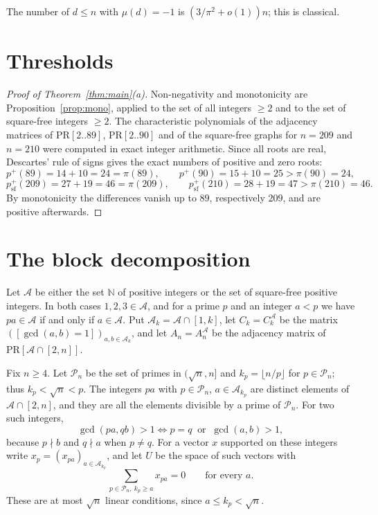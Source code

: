 \documentclass[11pt]{amsart}
\theoremstyle{definition}
\theoremstyle{remark}
\newcommand{\PR}{\mathrm{PR}}
\newcommand{\pp}{p^{+}}
\newcommand{\N}{\mathbb N}
\begin{document}
The number of $d\le n$ with $\mu(d)=-1$ is $(3/\pi^2+o(1))n$; this is classical.

\section{Thresholds}

\begin{proof}[Proof of Theorem~\ref{thm:main}(a)]
Non-negativity and monotonicity are Proposition~\ref{prop:mono}, applied to the set of all integers $\ge2$ and to the set of square-free integers $\ge2$. The characteristic polynomials of the adjacency matrices of $\PR[2..89]$, $\PR[2..90]$ and of the square-free graphs for $n=209$ and $n=210$ were computed in exact integer arithmetic. Since all roots are real, Descartes' rule of signs gives the exact numbers of positive and zero roots:
\[
\pp(89)=14+10=24=\pi(89),\qquad \pp(90)=15+10=25>\pi(90)=24,
\]
\[
\pp_{\mathrm{sf}}(209)=27+19=46=\pi(209),\qquad \pp_{\mathrm{sf}}(210)=28+19=47>\pi(210)=46 .
\]
By monotonicity the differences vanish up to $89$, respectively $209$, and are positive afterwards.
\end{proof}

\section{The block decomposition}

Let $\mathcal A$ be either the set $\N$ of positive integers or the set of square-free positive integers. In both cases $1,2,3\in\mathcal A$, and for a prime $p$ and an integer $a<p$ we have $pa\in\mathcal A$ if and only if $a\in\mathcal A$. Put $\mathcal A_k=\mathcal A\cap[1,k]$, let $C_k=C_k^{\mathcal A}$ be the matrix $([\gcd(a,b)=1])_{a,b\in\mathcal A_k}$, and let $A_n=A_n^{\mathcal A}$ be the adjacency matrix of $\PR[\mathcal A\cap[2,n]]$.

Fix $n\ge4$. Let $\mathcal P_n$ be the set of primes in $(\sqrt n,n]$ and $k_p=\lfloor n/p\rfloor$ for $p\in\mathcal P_n$; thus $k_p<\sqrt n<p$. The integers $pa$ with $p\in\mathcal P_n$, $a\in\mathcal A_{k_p}$ are distinct elements of $\mathcal A\cap[2,n]$, and they are all the elements divisible by a prime of $\mathcal P_n$. For two such integers,
\begin{equation}\label{eq:gcd}
\gcd(pa,qb)>1\iff p=q\ \text{ or }\ \gcd(a,b)>1 ,
\end{equation}
because $p\nmid b$ and $q\nmid a$ when $p\ne q$. For a vector $x$ supported on these integers write $x_p=(x_{pa})_{a\in\mathcal A_{k_p}}$, and let $U$ be the space of such vectors with
\[
\sum_{p\in\mathcal P_n,\ k_p\ge a}x_{pa}=0\qquad\text{for every }a .
\]
These are at most $\sqrt n$ linear conditions, since $a\le k_p<\sqrt n$.
\end{document}

